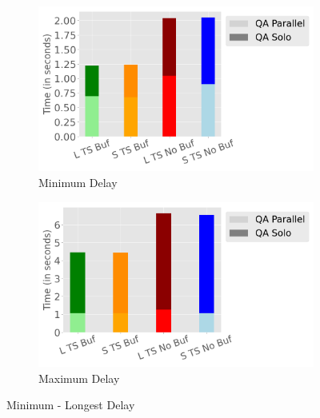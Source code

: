 \begin{figure}
	\centering
	\begin{subfigure}[c]{0.48\textwidth}
		\includegraphics[width=1\textwidth]   {figures/Experiments/Dynamic/Delays/shortest_delay.png}
		\caption{Minimum Delay}
		\label{fig:min-delay}
	\end{subfigure}
	\begin{subfigure}[c]{0.48\textwidth}
		\includegraphics[width=1\textwidth]   {figures/Experiments/Dynamic/Delays/longest_delay.png}
		\caption{Maximum Delay}
		\label{fig:max-delay}
	\end{subfigure}
	\caption{Minimum - Longest Delay}
	\label{fig:min-max-delay}
\end{figure}

